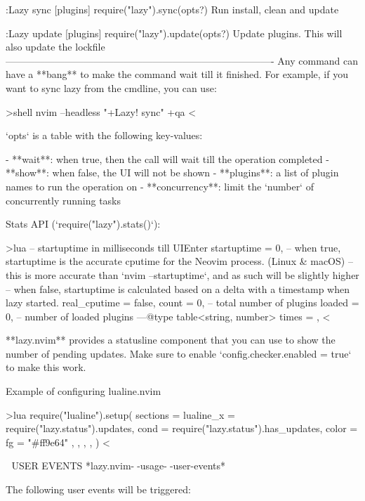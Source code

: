 \begin{listing}
  :Lazy sync [plugins]      require("lazy").sync(opts?)      Run install, clean and
                                                             update

  :Lazy update [plugins]    require("lazy").update(opts?)    Update plugins. This
                                                             will also update the
                                                             lockfile
  ----------------------------------------------------------------------------------
Any command can have a **bang** to make the command wait till it finished. For
example, if you want to sync lazy from the cmdline, you can use:

>shell
    nvim --headless "+Lazy! sync" +qa
<

`opts` is a table with the following key-values:

- **wait**: when true, then the call will wait till the operation completed
- **show**: when false, the UI will not be shown
- **plugins**: a list of plugin names to run the operation on
- **concurrency**: limit the `number` of concurrently running tasks

Stats API (`require("lazy").stats()`):

>lua
{
-- startuptime in milliseconds till UIEnter
startuptime = 0,
-- when true, startuptime is the accurate cputime for the Neovim process. (Linux & macOS)
-- this is more accurate than `nvim --startuptime`, and as such will be slightly higher
-- when false, startuptime is calculated based on a delta with a timestamp when lazy started.
real_cputime = false,
count = 0, -- total number of plugins
loaded = 0, -- number of loaded plugins
---@type table<string, number>
times = {},
}
<

**lazy.nvim** provides a statusline component that you can use to show the
number of pending updates. Make sure to enable `config.checker.enabled = true`
to make this work.

Example of configuring lualine.nvim ~

>lua
require("lualine").setup({
sections = {
lualine_x = {
{
require("lazy.status").updates,
cond = require("lazy.status").has_updates,
color = { fg = "#ff9e64" },
},
},
},
})
<


📆 USER EVENTS                       *lazy.nvim-🚀-usage-📆-user-events*

The following user events will be triggered:


\end{listing}
